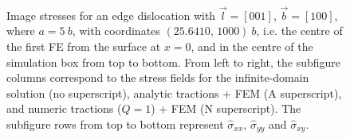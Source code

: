 \documentclass[11pt]{iopart}
\begin{document}
\begin{figure}
    ~
    ~
    ~
    \caption{Image stresses for an edge dislocation with $\vec{l} = [0 0 1]$, $\vec{b} = [1 0 0]$, where $a = 5~b$, with coordinates $(25.6410,\, 1000)~b$, i.e. the centre of the first FE from the surface at $x=0$, and in the centre of the simulation box from top to bottom. From left to right, the subfigure columns correspond to the stress fields for the infinite-domain solution (no superscript), analytic tractions + FEM (A superscript), and numeric tractions ($Q = 1$) + FEM (N superscript). The subfigure rows from top to bottom represent $\hat{\sigma}_{xx}$, $\hat{\sigma}_{yy}$ and $\hat{\sigma}_{xy}$.}
    \label{f:head_vs_ana_vs_num_eperp}
\end{figure}
\end{document}
